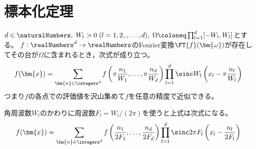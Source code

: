 \chapter{標本化定理}
    \label{標本化定理}
    \begin{shadebox}
        $d\in\naturalNumbers,\;W_l>0\;(l=1,2,,\dots,d),\;\Omega\coloneq\prod_{l=1}^d [-W_l,W_l]$とする。
        $f:\realNumbers^d\to\realNumbers$のFourier変換$\FT{f}(\bm{\omega})$が存在してその台が$\Omega$に含まれるとき，次式が成り立つ。
        \[ f(\bm{x}) = \sum_{\bm{n}\in\integers^d}f\left(\pi\frac{n_1}{W_1},\dots,\pi\frac{n_d}{W_d}\right)\prod_{l=1}^d\sinc W_l\left(x_l - \pi\frac{n_l}{W_l}\right) \]
        つまり$f$の各点での評価値を沢山集めて$f$を任意の精度で近似できる。
        \par
        角周波数$W_l$のかわりに周波数$F_l=W_l/(2\pi)$を使うと上式は次式になる。
        \[ f(\bm{x}) = \sum_{\bm{n}\in\integers^d}f\left(\frac{n_1}{2F_1},\dots,\frac{n_d}{2F_d}\right)\prod_{l=1}^d\sinc 2\pi F_l\left(x_l - \frac{n_l}{2F_l}\right) \]
    \end{shadebox}
